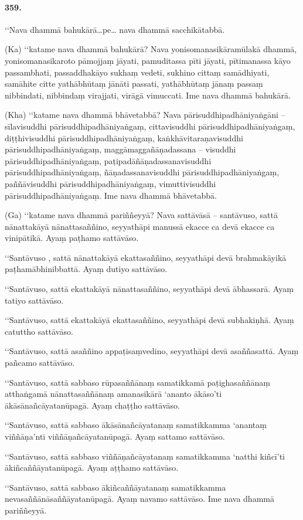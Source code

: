 \paragraph{359.} ‘‘Nava dhammā bahukārā…pe… nava dhammā sacchikātabbā.

(Ka) ‘‘katame nava dhammā bahukārā? Nava yonisomanasikāramūlakā dhammā, yonisomanasikaroto pāmojjaṃ jāyati, pamuditassa pīti jāyati, pītimanassa kāyo passambhati, passaddhakāyo sukhaṃ vedeti, sukhino cittaṃ samādhiyati, samāhite citte yathābhūtaṃ jānāti passati, yathābhūtaṃ jānaṃ passaṃ nibbindati, nibbindaṃ virajjati, virāgā vimuccati. Ime nava dhammā bahukārā.

(Kha) ‘‘katame nava dhammā bhāvetabbā? Nava pārisuddhipadhāniyaṅgāni – sīlavisuddhi pārisuddhipadhāniyaṅgaṃ, cittavisuddhi pārisuddhipadhāniyaṅgaṃ, diṭṭhivisuddhi pārisuddhipadhāniyaṅgaṃ, kaṅkhāvitaraṇavisuddhi pārisuddhipadhāniyaṅgaṃ, maggāmaggañāṇadassana – visuddhi pārisuddhipadhāniyaṅgaṃ, paṭipadāñāṇadassanavisuddhi pārisuddhipadhāniyaṅgaṃ, ñāṇadassanavisuddhi pārisuddhipadhāniyaṅgaṃ, paññāvisuddhi pārisuddhipadhāniyaṅgaṃ, vimuttivisuddhi pārisuddhipadhāniyaṅgaṃ. Ime nava dhammā bhāvetabbā.

(Ga) ‘‘katame nava dhammā pariññeyyā? Nava sattāvāsā – santāvuso, sattā nānattakāyā nānattasaññino, seyyathāpi manussā ekacce ca devā ekacce ca vinipātikā. Ayaṃ paṭhamo sattāvāso.

‘‘Santāvuso , sattā nānattakāyā ekattasaññino, seyyathāpi devā brahmakāyikā paṭhamābhinibbattā. Ayaṃ dutiyo sattāvāso.

‘‘Santāvuso, sattā ekattakāyā nānattasaññino, seyyathāpi devā ābhassarā. Ayaṃ tatiyo sattāvāso.

‘‘Santāvuso, sattā ekattakāyā ekattasaññino, seyyathāpi devā subhakiṇhā. Ayaṃ catuttho sattāvāso.

‘‘Santāvuso, sattā asaññino appaṭisaṃvedino, seyyathāpi devā asaññasattā. Ayaṃ pañcamo sattāvāso.

‘‘Santāvuso, sattā sabbaso rūpasaññānaṃ samatikkamā paṭighasaññānaṃ atthaṅgamā nānattasaññānaṃ amanasikārā ‘ananto ākāso’ti ākāsānañcāyatanūpagā. Ayaṃ chaṭṭho sattāvāso.

‘‘Santāvuso, sattā sabbaso ākāsānañcāyatanaṃ samatikkamma ‘anantaṃ viññāṇa’nti viññāṇañcāyatanūpagā. Ayaṃ sattamo sattāvāso.

‘‘Santāvuso, sattā sabbaso viññāṇañcāyatanaṃ samatikkamma ‘natthi kiñcī’ti ākiñcaññāyatanūpagā. Ayaṃ aṭṭhamo sattāvāso.

‘‘Santāvuso, sattā sabbaso ākiñcaññāyatanaṃ samatikkamma nevasaññānāsaññāyatanūpagā. Ayaṃ navamo sattāvāso. Ime nava dhammā pariññeyyā.

